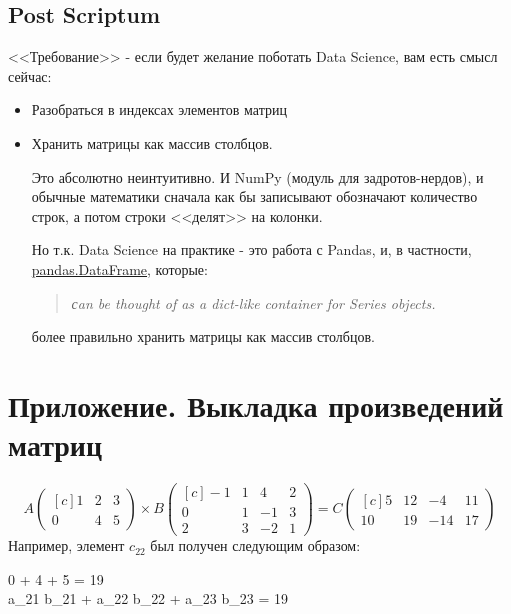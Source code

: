 	\subsection{Post Scriptum}
	<<Требование>> - если будет желание поботать Data Science, вам есть смысл сейчас:
	\begin{itemize}
		\item Разобраться в индексах элементов матриц
		\item Хранить матрицы как массив столбцов.
		
		Это абсолютно неинтуитивно. И NumPy (модуль для задротов-нердов), и обычные математики сначала как бы записывают обозначают количество строк, а потом строки <<делят>> на колонки. 
		
		Но т.к. Data Science на практике - это работа с Pandas, и, в частности, \href{https://pandas.pydata.org/docs/reference/api/pandas.DataFrame.html#pandas.DataFrame}{pandas.DataFrame}, которые:
		\begin{quotation}\begin{center}
			\textit{сan be thought of as a dict-like container for Series objects.}
		\end{center}\end{quotation}
		более правильно хранить матрицы как массив столбцов.
	\end{itemize}
	
	\section{Приложение. Выкладка произведений матриц}
		\[	A
			\begin{pmatrix*}[c]
				1 & 2 & 3 \\
				0 & 4 & 5
			\end{pmatrix*}
			\times
			B
			\begin{pmatrix*}[c]
				-1 & 1 & 4 & 2 \\
				0 & 1 & -1 & 3 \\
				2 & 3 & -2 & 1
			\end{pmatrix*}
			= C
			\begin{pmatrix*}[c]
				5 & 12 & -4 & 11 \\
				10 & 19 & -14 & 17
			\end{pmatrix*}
		\]
		Например, элемент $c_{22}$ был получен следующим образом:
		\begin{eq_array}
			0  \cdot 1  + 4  + 5  = 19 \\
			a_{21} \cdot b_{21} + a_{22} \cdot b_{22} + a_{23} \cdot b_{23} = 19
		\end{eq_array}
		\[\]
